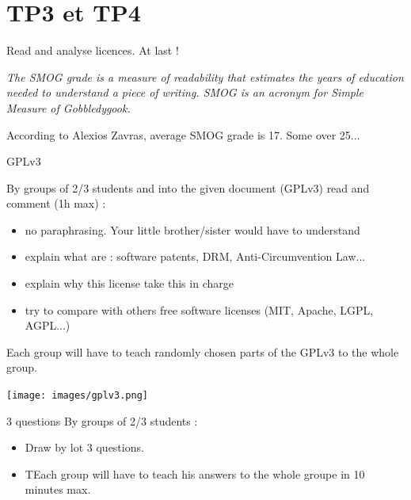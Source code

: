 \documentclass{beamer}
\begin{document}
\section{TP3 et TP4}

\begin{frame}{Read and analyse licences. At last !}

\textit{The SMOG grade is a measure of readability that estimates the years of education needed to understand a piece of writing. SMOG is an acronym for Simple Measure of Gobbledygook.}

According to Alexios Zavras, average SMOG grade is 17. Some over 25...

\end{frame}


\begin{frame}{GPLv3}

  By groups of 2/3 students and into the given document (GPLv3) read and comment (1h max) :
  \begin{itemize}
    \item no paraphrasing. Your little brother/sister would have to understand
    \item explain what are : software patents, DRM, Anti-Circumvention Law...
    \item explain why this license take this in charge
    \item try to compare with others free software licenses (MIT, Apache, LGPL, AGPL...)
   \end{itemize}
   
  Each group will have to teach randomly chosen parts of the GPLv3 to the whole group.

  \begin{center}
    \texttt{[image: images/gplv3.png]}
\end{center}
\end{frame}

\begin{frame}{3 questions}
 By groups of 2/3 students :
 \begin{itemize}
 \item Draw by lot 3 questions.
 \item TEach group will have to teach his answers to the whole groupe in 10 minutes max.
  \end{itemize}

\end{frame}

\end{document}
